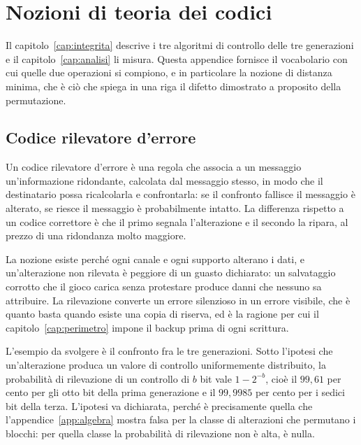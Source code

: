
\chapter{Nozioni di teoria dei codici}
\label{app:codici}

Il capitolo~\ref{cap:integrita} descrive i tre algoritmi di controllo delle tre generazioni e il capitolo~\ref{cap:analisi} li misura. Questa appendice fornisce il vocabolario con cui quelle due operazioni si compiono, e in particolare la nozione di distanza minima, che è ciò che spiega in una riga il difetto dimostrato a proposito della permutazione.

\section{Codice rilevatore d'errore}

Un codice rilevatore d'errore è una regola che associa a un messaggio un'informazione ridondante, calcolata dal messaggio stesso, in modo che il destinatario possa ricalcolarla e confrontarla: se il confronto fallisce il messaggio è alterato, se riesce il messaggio è probabilmente intatto. La differenza rispetto a un codice correttore è che il primo segnala l'alterazione e il secondo la ripara, al prezzo di una ridondanza molto maggiore.

La nozione esiste perché ogni canale e ogni supporto alterano i dati, e un'alterazione non rilevata è peggiore di un guasto dichiarato: un salvataggio corrotto che il gioco carica senza protestare produce danni che nessuno sa attribuire. La rilevazione converte un errore silenzioso in un errore visibile, che è quanto basta quando esiste una copia di riserva, ed è la ragione per cui il capitolo~\ref{cap:perimetro} impone il backup prima di ogni scrittura.

L'esempio da svolgere è il confronto fra le tre generazioni. Sotto l'ipotesi che un'alterazione produca un valore di controllo uniformemente distribuito, la probabilità di rilevazione di un controllo di $b$ bit vale $1 - 2^{-b}$, cioè il $99{,}61$ per cento per gli otto bit della prima generazione e il $99{,}9985$ per cento per i sedici bit della terza. L'ipotesi va dichiarata, perché è precisamente quella che l'appendice~\ref{app:algebra} mostra falsa per la classe di alterazioni che permutano i blocchi: per quella classe la probabilità di rilevazione non è alta, è nulla.


